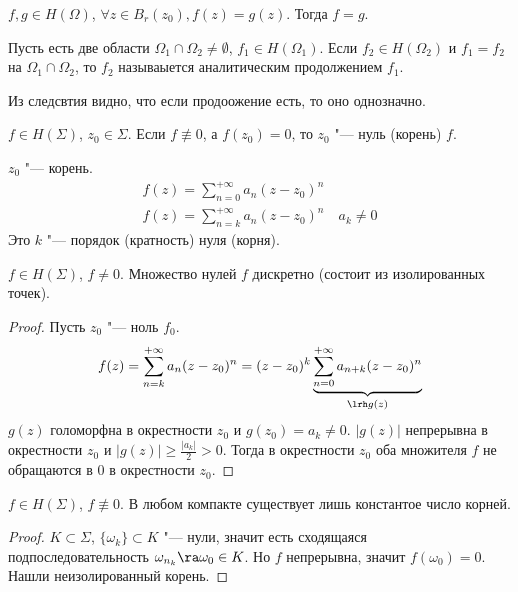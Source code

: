 \begin{conseq}
	$f, g \in H(\Omega)$, $\forall z \in B_r(z_0), f(z) = g(z)$.
	Тогда $f = g$.
\end{conseq}

\begin{Def}
	Пусть есть две области $\Omega_1 \cap \Omega_2 \ne \emptyset$, $f_1 \in H(\Omega_1)$.
	Если $f_2 \in H(\Omega_2)$ и $f_1 = f_2$ на $\Omega_1 \cap \Omega_2$, то $f_2$ называыется аналитическим продолжением $f_1$.
\end{Def}

\begin{conseq}
	Из следсвтия видно, что если продоожение есть, то оно однозначно.
\end{conseq}

\begin{Def}
	$f \in H(\Sigma)$, $z_0 \in \Sigma$.
	Если $f \nequiv 0$, а $f(z_0) = 0$, то $z_0$ "--- нуль (корень) $f$.
\end{Def}

\begin{Rem}
	$z_0$ "--- корень.
	\begin{gather*}
			f(z) = \sum_{n=0}^{+\infty} a_n (z - z_0)^n \\
			f(z) = \sum_{n=k}^{+\infty} a_n (z - z_0)^n \quad a_k \ne 0
	\end{gather*}
	Это $k$ "--- порядок (кратность) нуля (корня).
\end{Rem}

\begin{theorem}
	$f \in H(\Sigma)$, $f \ne 0$.
	Множество нулей $f$ дискретно (состоит из изолированных точек).
\end{theorem}
\begin{proof}
	Пусть $z_0$ "--- ноль $f_0$.
	\begin{gather*}
		f(z) = \sum_{n=k}^{+\infty} a_n (z - z_0)^n = (z - z_0)^k \underbrace{\sum_{n=0}^{+\infty} a_{n+k} (z - z_0)^n}_{\lrh g(z)}
	\end{gather*}
	$g(z)$ голоморфна в окрестности $z_0$ и $g(z_0) = a_k \ne 0$.
	$|g(z)|$ непрерывна в окрестности $z_0$ и $|g(z)| \ge \frac{|a_k|}2 > 0$.
	Тогда в окрестности $z_0$ оба множителя $f$ не обращаются в 0 в окрестности $z_0$.
\end{proof}

\begin{conseq}
	$f \in H(\Sigma)$, $f \nequiv 0$.
	В любом компакте существует лишь константое число корней.
\end{conseq}
\begin{proof}
	$K \subset \Sigma$, $\{\omega_k\} \subset K$ "--- нули, значит есть сходящаяся подпоследовательность
	$\omega_{n_k} \ra \omega_0 \in K$.
	Но $f$ непрерывна, значит $f(\omega_0) = 0$.
	Нашли неизолированный корень.
\end{proof}


